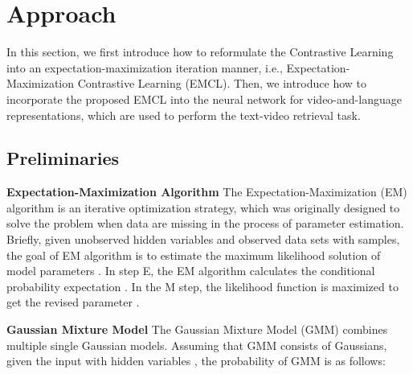 \documentclass{article}
\newcommand{\myparagraph}[1]{\textbf{#1}\hspace{1.8ex}}
\begin{document}
\vspace{-5pt}
\section{Approach}
\vspace{-5pt}
In this section, we first introduce how to reformulate the Contrastive Learning into an expectation-maximization iteration manner, i.e., Expectation-Maximization Contrastive Learning (EMCL). Then, we introduce how to incorporate the proposed EMCL into the neural network for video-and-language representations, which are used to perform the text-video retrieval task.

\subsection{Preliminaries}\label{assumptions0}
\myparagraph{Expectation-Maximization Algorithm}
The Expectation-Maximization (EM) algorithm \cite{dempster1977maximum} is an iterative optimization strategy, which was originally designed to solve the problem when data are missing in the process of parameter estimation. Briefly, given unobserved hidden variables  and observed data sets  with  samples, the goal of EM algorithm is to estimate the maximum likelihood solution of model parameters .
In step E, the EM algorithm calculates the conditional probability expectation . In the M step, the likelihood function is maximized to get the revised parameter .

\myparagraph{Gaussian Mixture Model} The Gaussian Mixture Model (GMM) \cite{richardson1997on} combines multiple single Gaussian models. Assuming that GMM consists of  Gaussians, given the input  with hidden variables , the probability of GMM is as follows:
\end{document}

